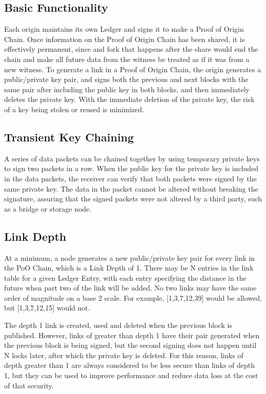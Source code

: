 \documentclass{article}
\begin{document}
\subsection {Basic Functionality}
Each origin maintains its own Ledger and signs it to make a Proof of Origin Chain. Once information on the Proof of Origin Chain has been shared, it is effectively permanent, since and fork that happens after the share would end the chain and make all future data from the witness be treated as if it was from a new witness.
To generate a link in a Proof of Origin Chain, the origin generates a public/private key pair, and signs both the previous and next blocks with the same pair after including the public key in both blocks, and then immediately deletes the private key.  With the immediate deletion of the private key, the risk of a key being stolen or reused is minimized.

\subsection {Transient Key Chaining}
A series of data packets can be chained together by using temporary private keys to sign two packets in a row.  When the public key for the private key is included in the data packets, the receiver can verify that both packets were signed by the same private key.  The data in the packet cannot be altered without breaking the signature, assuring that the signed packets were not altered by a third party, such as a bridge or storage node.

\subsection {Link Depth}
At a minimum, a node generates a new public/private key pair for every link in the PoO Chain, which is a Link Depth of 1.  There may be N entries in the link table for a given Ledger Entry, with each entry specifying the distance in the future when part two of the link will be added. No two links may have the same order of magnitude on a base 2 scale. For example, [1,3,7,12,39] would be allowed, but [1,3,7,12,15] would not.

The depth 1 link is created, used and deleted when the previous block is published.  However, links of greater than depth 1 have their pair generated when the previous block is being signed, but the second signing does not happen until N locks later, after which the private key is deleted.  For this reason, links of depth greater than 1 are always considered to be less secure than links of depth 1, but they can be used to improve performance and reduce data loss at the cost of that security.
\end{document}

